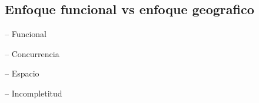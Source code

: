 \subsection{Enfoque funcional vs enfoque geografico}

\lipsum[1]

-- Funcional\\

\lipsum[1]

-- Concurrencia\\

\lipsum[1]

-- Espacio\\

\lipsum[1]

-- Incompletitud\\

\lipsum[1]
